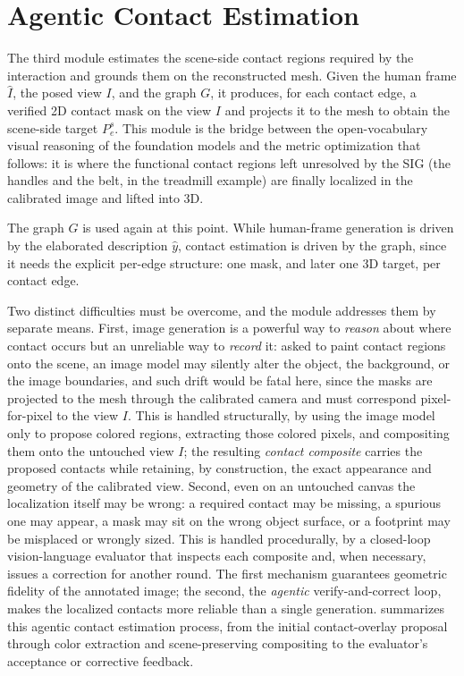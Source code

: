 \section{Agentic Contact Estimation}
\label{sec:method-contact-estimation}

The third module estimates the scene-side contact regions required by the interaction and grounds them on the reconstructed mesh. Given the human frame $\hat{I}$, the posed view $I$, and the graph $G$, it produces, for each contact edge, a verified 2D contact mask on the view $I$ and projects it to the mesh to obtain the scene-side target $P_e^s$. This module is the bridge between the open-vocabulary visual reasoning of the foundation models and the metric optimization that follows: it is where the functional contact regions left unresolved by the SIG (the handles and the belt, in the treadmill example) are finally localized in the calibrated image and lifted into 3D.

The graph $G$ is used again at this point. While human-frame generation is driven by the elaborated description $\hat{y}$, contact estimation is driven by the graph, since it needs the explicit per-edge structure: one mask, and later one 3D target, per contact edge.

Two distinct difficulties must be overcome, and the module addresses them by separate means. First, image generation is a powerful way to \emph{reason} about where contact occurs but an unreliable way to \emph{record} it: asked to paint contact regions onto the scene, an image model may silently alter the object, the background, or the image boundaries, and such drift would be fatal here, since the masks are projected to the mesh through the calibrated camera and must correspond pixel-for-pixel to the view $I$. This is handled structurally, by using the image model only to propose colored regions, extracting those colored pixels, and compositing them onto the untouched view $I$; the resulting \emph{contact composite} carries the proposed contacts while retaining, by construction, the exact appearance and geometry of the calibrated view. Second, even on an untouched canvas the localization itself may be wrong: a required contact may be missing, a spurious one may appear, a mask may sit on the wrong object surface, or a footprint may be misplaced or wrongly sized. This is handled procedurally, by a closed-loop vision-language evaluator that inspects each composite and, when necessary, issues a correction for another round. The first mechanism guarantees geometric fidelity of the annotated image; the second, the \emph{agentic} verify-and-correct loop, makes the localized contacts more reliable than a single generation.  summarizes this agentic contact estimation process, from the initial contact-overlay proposal through color extraction and scene-preserving compositing to the evaluator's acceptance or corrective feedback.

